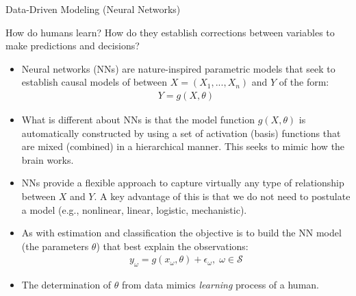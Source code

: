 \documentclass[9pt]{beamer}
\begin{document}
\begin{frame}{Data-Driven Modeling (Neural Networks)}

\begin{block}{}
How do humans learn? How do they establish corrections between variables to make predictions and decisions? 
\end{block}

\begin{itemize}
\item Neural networks (NNs) are nature-inspired parametric models that seek to establish causal models of between $X=(X_1,...,X_n)$ and $Y$ of the form:
\begin{align*}
Y=g(X,\theta)
\end{align*}
\item What is different about NNs is that the model function $g(X,\theta)$ is automatically constructed by using a set of activation (basis) functions that are mixed (combined) in a hierarchical manner.  This seeks to mimic how the brain works. 

\item NNs provide a flexible approach to capture virtually any type of relationship between $X$ and $Y$. A key advantage of this is that we do not need to postulate a model (e.g., nonlinear, linear, logistic, mechanistic).  

\item As with estimation and classification the objective is to build the NN model (the parameters $\theta$) that best explain the observations:
\begin{align*}
y_\omega=g(x_\omega,\theta)+\epsilon_\omega,\; \omega \in \mathcal{S}
\end{align*}
\item The determination of $\theta$ from data mimics {\em learning} process of a human. 

\end{itemize}

\end{frame}


\end{document}
